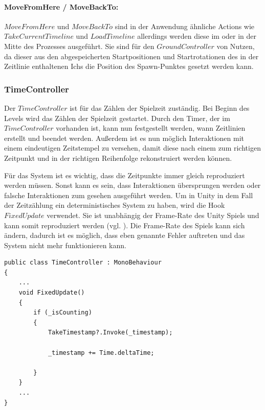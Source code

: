 \paragraph{MoveFromHere / MoveBackTo:}
$MoveFromHere$ und $MoveBackTo$ sind in der Anwendung ähnliche Actions wie $TakeCurrentTimeline$ und $LoadTimeline$ allerdings werden diese im  oder  in der Mitte des Prozesses ausgeführt. Sie sind für den $GroundController$ von Nutzen, da dieser aus den abgespeicherten Startpositionen und Startrotationen des in der Zeitlinie enthaltenen Ichs die Position des Spawn-Punktes gesetzt werden kann.

\subsubsection{TimeController}
Der $TimeController$ ist für das Zählen der Spielzeit zuständig. Bei Beginn des Levels wird das Zählen der Spielzeit gestartet. Durch den Timer, der im $TimeController$ vorhanden ist, kann nun festgestellt werden, wann Zeitlinien erstellt und beendet werden. Außerdem ist es nun möglich Interaktionen mit einem eindeutigen Zeitstempel zu versehen, damit diese nach einem  zum richtigen Zeitpunkt und in der richtigen Reihenfolge rekonstruiert werden können. 

Für das System ist es wichtig, dass die Zeitpunkte immer gleich reproduziert werden müssen. Sonst kann es sein, dass Interaktionen übersprungen werden oder falsche Interaktionen zum gesehen ausgeführt werden. Um in Unity in dem Fall der Zeitzählung ein deterministisches System zu haben, wird die Hook $FixedUpdate$ verwendet. Sie ist unabhängig der Frame-Rate des Unity Spiels und kann somit reproduziert werden (vgl. \cite{technologies_unity_fu}). Die Frame-Rate des Spiels kann sich ändern, dadurch ist es möglich, dass eben genannte Fehler auftreten und das System nicht mehr funktionieren kann.
\begin{lstlisting}[caption={TimeController.ts dieses Prototyps}, label={sec:time-controller}]
public class TimeController : MonoBehaviour
{
    ...
    void FixedUpdate()
    {
        if (_isCounting)
        {
            TakeTimestamp?.Invoke(_timestamp);

            _timestamp += Time.deltaTime;

        }
    }
    ...
}
\end{lstlisting}


